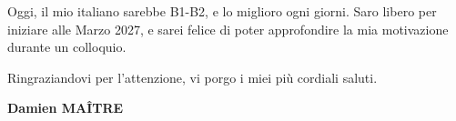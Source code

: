 \documentclass[a4paper,11pt]{extarticle}
\begin{document}
Oggi, il mio italiano sarebbe B1-B2, e lo miglioro ogni giorni. Saro libero per iniziare alle Marzo 2027, e sarei felice di poter approfondire la mia motivazione durante un colloquio.

Ringraziandovi per l'attenzione, vi porgo i miei più cordiali saluti.
\vspace{14pt}
\begin{flushright}
  \textbf{\color{accent}Damien MAÎTRE}
\end{flushright}
\end{document}
